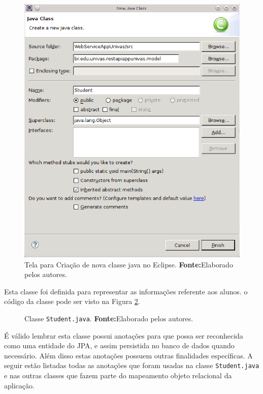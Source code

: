 	 \begin{figure}[h!]
		\centerline{\includegraphics[scale=0.8]{./imagens/2_q_metodologico/4_procedimentos_resultados/43_webservice/432_desenvolvimento/desws10.png}}
		\caption[Tela para Criação de nova classe java no Eclipse]{Tela para Criação
		de nova classe java no Eclipse.
			\textbf{Fonte:}Elaborado pelos autores.}
		\label{fig:desws10}
	\end{figure}
	
	\pagebreak

	\par Esta classe foi definida para representar as informações referente aos
alunos. o código da classe pode ser visto na Figura \ref{fig:desws11}. 
	
	
	\begin{figure}[h!]
		
		\caption[Classe Student.java]{Classe \texttt{Student.java}.
			\textbf{Fonte:}Elaborado pelos autores.}
		\label{fig:desws11}
	\end{figure}
	
	\pagebreak
	
	\par É válido lembrar esta classe possui anotações para que possa ser
reconhecida como uma entidade do JPA, e assim persistida no banco de dados
quando necessário. Além disso estas anotações possuem outras finalidades
específicas. A seguir estão listadas todas as anotações  que foram usadas na
classe \texttt{Student.java} e nas outras classes que fazem parte do mapeamento
objeto relacional da aplicação.

